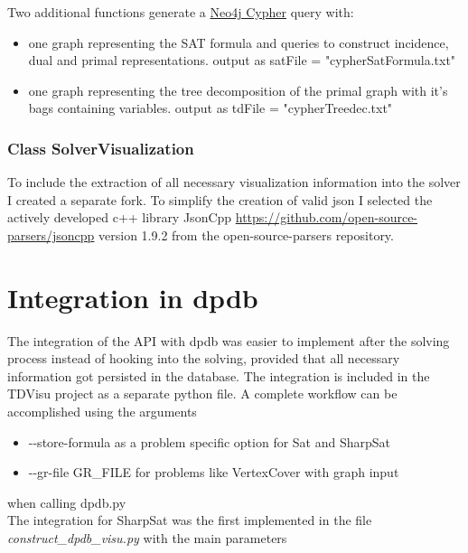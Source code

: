 \documentclass[a4paper, 12pt]{scrartcl}
\begin{document}
Two additional functions generate a \href{https://neo4j.com/docs/cypher-refcard/current/}{Neo4j Cypher} query with:
\begin{itemize}
	\item one graph representing the SAT formula and  queries to construct incidence, dual and primal representations.
	output as satFile = "cypherSatFormula.txt"
	\item one graph representing the tree decomposition of the primal graph with it's bags containing variables.
	output as tdFile = "cypherTreedec.txt"
\end{itemize}


\subsubsection{Class SolverVisualization}

To include the extraction of all necessary visualization information into the solver I created a separate fork.
To simplify the creation of valid json I selected the actively developed c++ library JsonCpp \url{https://github.com/open-source-parsers/jsoncpp} version 1.9.2 from the open-source-parsers repository.


\newpage
\section{Integration in dpdb}
The integration of the API with dpdb was easier to implement after the solving process instead of
hooking into the solving, 
provided that all necessary information got persisted in the database.
The integration is included in the TDVisu project as a separate python file.
A complete workflow can be accomplished using the arguments
\begin{itemize}
	\item -{}-store-formula as a problem specific option for Sat and SharpSat
	\item -{}-gr-file GR\_FILE for problems like VertexCover with graph input 
\end{itemize}
when calling dpdb.py\\
The integration for SharpSat was the first implemented in the file \textit{construct\_dpdb\_visu.py} with
the main parameters
\end{document}
